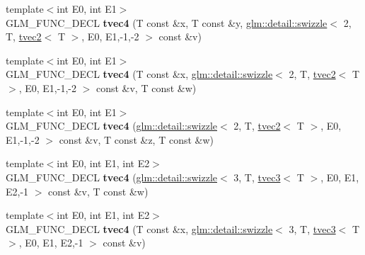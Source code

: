 \begin{DoxyCompactItemize}
\item 
\hypertarget{structglm_1_1detail_1_1tvec4_ae9a645660f570ca0e832fe401a611245}{{\footnotesize template$<$int E0, int E1$>$ }\\G\-L\-M\-\_\-\-F\-U\-N\-C\-\_\-\-D\-E\-C\-L {\bfseries tvec4} (T const \&x, T const \&y, \hyperlink{structglm_1_1detail_1_1swizzle}{glm\-::detail\-::swizzle}$<$ 2, T, \hyperlink{structglm_1_1detail_1_1tvec2}{tvec2}$<$ T $>$, E0, E1,-\/1,-\/2 $>$ const \&v)}\label{structglm_1_1detail_1_1tvec4_ae9a645660f570ca0e832fe401a611245}

\item 
\hypertarget{structglm_1_1detail_1_1tvec4_a94bb584377ca8a46ae35f855aed45483}{{\footnotesize template$<$int E0, int E1$>$ }\\G\-L\-M\-\_\-\-F\-U\-N\-C\-\_\-\-D\-E\-C\-L {\bfseries tvec4} (T const \&x, \hyperlink{structglm_1_1detail_1_1swizzle}{glm\-::detail\-::swizzle}$<$ 2, T, \hyperlink{structglm_1_1detail_1_1tvec2}{tvec2}$<$ T $>$, E0, E1,-\/1,-\/2 $>$ const \&v, T const \&w)}\label{structglm_1_1detail_1_1tvec4_a94bb584377ca8a46ae35f855aed45483}

\item 
\hypertarget{structglm_1_1detail_1_1tvec4_abd003ec43fbcc292214a4ce11fe93993}{{\footnotesize template$<$int E0, int E1$>$ }\\G\-L\-M\-\_\-\-F\-U\-N\-C\-\_\-\-D\-E\-C\-L {\bfseries tvec4} (\hyperlink{structglm_1_1detail_1_1swizzle}{glm\-::detail\-::swizzle}$<$ 2, T, \hyperlink{structglm_1_1detail_1_1tvec2}{tvec2}$<$ T $>$, E0, E1,-\/1,-\/2 $>$ const \&v, T const \&z, T const \&w)}\label{structglm_1_1detail_1_1tvec4_abd003ec43fbcc292214a4ce11fe93993}

\item 
\hypertarget{structglm_1_1detail_1_1tvec4_a4e9e3c73a1c3f3e7a545a0ed68819114}{{\footnotesize template$<$int E0, int E1, int E2$>$ }\\G\-L\-M\-\_\-\-F\-U\-N\-C\-\_\-\-D\-E\-C\-L {\bfseries tvec4} (\hyperlink{structglm_1_1detail_1_1swizzle}{glm\-::detail\-::swizzle}$<$ 3, T, \hyperlink{structglm_1_1detail_1_1tvec3}{tvec3}$<$ T $>$, E0, E1, E2,-\/1 $>$ const \&v, T const \&w)}\label{structglm_1_1detail_1_1tvec4_a4e9e3c73a1c3f3e7a545a0ed68819114}

\item 
\hypertarget{structglm_1_1detail_1_1tvec4_ac8d88c6d34185e88a78cd496114fff8f}{{\footnotesize template$<$int E0, int E1, int E2$>$ }\\G\-L\-M\-\_\-\-F\-U\-N\-C\-\_\-\-D\-E\-C\-L {\bfseries tvec4} (T const \&x, \hyperlink{structglm_1_1detail_1_1swizzle}{glm\-::detail\-::swizzle}$<$ 3, T, \hyperlink{structglm_1_1detail_1_1tvec3}{tvec3}$<$ T $>$, E0, E1, E2,-\/1 $>$ const \&v)}\label{structglm_1_1detail_1_1tvec4_ac8d88c6d34185e88a78cd496114fff8f}


\end{DoxyCompactItemize}
